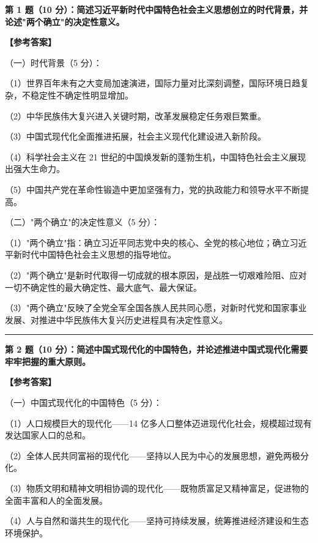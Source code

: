 \documentclass[12pt, a4paper]{article}
\begin{document}
\begin{answerbox}
\noindent\textbf{第 1 题（10 分）：简述习近平新时代中国特色社会主义思想创立的时代背景，并论述"两个确立"的决定性意义。}

\vspace{4pt}
\textbf{【参考答案】}

\noindent（一）时代背景（5 分）：

（1）世界百年未有之大变局加速演进，国际力量对比深刻调整，国际环境日趋复杂，不稳定性不确定性明显增加。

（2）中华民族伟大复兴进入关键时期，改革发展稳定任务艰巨繁重。

（3）中国式现代化全面推进拓展，社会主义现代化建设进入新阶段。

（4）科学社会主义在 21 世纪的中国焕发新的蓬勃生机，中国特色社会主义展现出强大生命力。

（5）中国共产党在革命性锻造中更加坚强有力，党的执政能力和领导水平不断提高。

\noindent（二）"两个确立"的决定性意义（5 分）：

（1）"两个确立"指：确立习近平同志党中央的核心、全党的核心地位；确立习近平新时代中国特色社会主义思想的指导地位。

（2）"两个确立"是新时代取得一切成就的根本原因，是战胜一切艰难险阻、应对一切不确定性的最大确定性、最大底气、最大保证。

（3）"两个确立"反映了全党全军全国各族人民共同心愿，对新时代党和国家事业发展、对推进中华民族伟大复兴历史进程具有决定性意义。

\vspace{6pt}
\noindent\rule{\linewidth}{0.4pt}
\vspace{4pt}

\noindent\textbf{第 2 题（10 分）：简述中国式现代化的中国特色，并论述推进中国式现代化需要牢牢把握的重大原则。}

\vspace{4pt}
\textbf{【参考答案】}

\noindent（一）中国式现代化的中国特色（5 分）：

（1）人口规模巨大的现代化——14 亿多人口整体迈进现代化社会，规模超过现有发达国家人口的总和。

（2）全体人民共同富裕的现代化——坚持以人民为中心的发展思想，避免两极分化。

（3）物质文明和精神文明相协调的现代化——既物质富足又精神富足，促进物的全面丰富和人的全面发展。

（4）人与自然和谐共生的现代化——坚持可持续发展，统筹推进经济建设和生态环境保护。


\end{answerbox}
\end{document}
